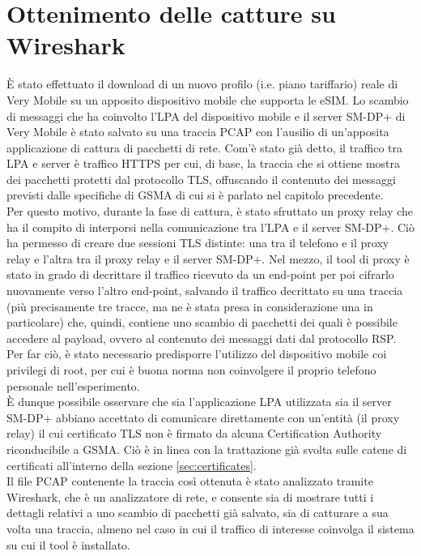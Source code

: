 \documentclass[10pt, oneside]{book}
\begin{document}
\section{Ottenimento delle catture su Wireshark}
È stato effettuato il download di un nuovo profilo (i.e. piano tariffario) reale di Very Mobile su un apposito dispositivo mobile che supporta le eSIM. Lo scambio di messaggi che ha coinvolto l'LPA del dispositivo mobile e il server SM-DP+ di Very Mobile è stato salvato su una traccia PCAP con l'ausilio di un'apposita applicazione di cattura di pacchetti di rete. Com'è stato già detto, il traffico tra LPA e server è traffico HTTPS per cui, di base, la traccia che si ottiene mostra dei pacchetti protetti dal protocollo TLS, offuscando il contenuto dei messaggi previsti dalle specifiche di GSMA di cui si è parlato nel capitolo precedente.\\
Per questo motivo, durante la fase di cattura, è stato sfruttato un proxy relay che ha il compito di interporsi nella comunicazione tra l'LPA e il server SM-DP+. Ciò ha permesso di creare due sessioni TLS distinte: una tra il telefono e il proxy relay e l'altra tra il proxy relay e il server SM-DP+. Nel mezzo, il tool di proxy è stato in grado di decrittare il traffico ricevuto da un end-point per poi cifrarlo nuovamente verso l'altro end-point, salvando il traffico decrittato su una traccia (più precisamente tre tracce, ma ne è stata presa in considerazione una in particolare) che, quindi, contiene uno scambio di pacchetti dei quali è possibile accedere al payload, ovvero al contenuto dei messaggi dati dal protocollo RSP. Per far ciò, è stato necessario predisporre l'utilizzo del dispositivo mobile coi privilegi di root, per cui è buona norma non coinvolgere il proprio telefono personale nell'esperimento.\\
È dunque possibile osservare che sia l'applicazione LPA utilizzata sia il server SM-DP+ abbiano accettato di comunicare direttamente con un'entità (il proxy relay) il cui certificato TLS non è firmato da alcuna Certification Authority riconducibile a GSMA. Ciò è in linea con la trattazione già svolta sulle catene di certificati all'interno della sezione \ref{sec:certificates}.\\
Il file PCAP contenente la traccia così ottenuta è stato analizzato tramite Wireshark, che è un analizzatore di rete, e consente sia di mostrare tutti i dettagli relativi a uno scambio di pacchetti già salvato, sia di catturare a sua volta una traccia, almeno nel caso in cui il traffico di interesse coinvolga il sistema su cui il tool è installato.
\end{document}
